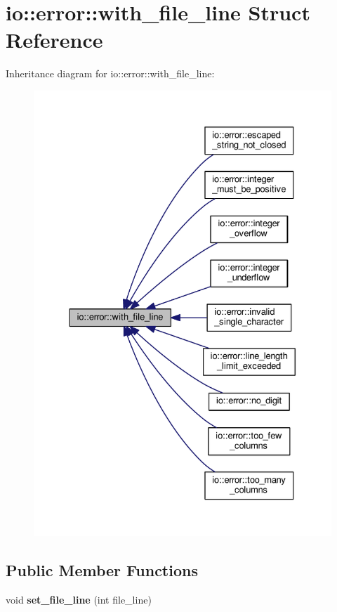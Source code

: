 \section{io\+:\+:error\+:\+:with\+\_\+file\+\_\+line Struct Reference}
\label{structio_1_1error_1_1with__file__line}


Inheritance diagram for io\+:\+:error\+:\+:with\+\_\+file\+\_\+line\+:\nopagebreak
\begin{figure}[H]
\begin{center}
\leavevmode
\includegraphics[width=330pt]{structio_1_1error_1_1with__file__line__inherit__graph}
\end{center}
\end{figure}
\subsection*{Public Member Functions}
\begin{DoxyCompactItemize}
\item 
void {\bfseries set\+\_\+file\+\_\+line} (int file\+\_\+line)\label{structio_1_1error_1_1with__file__line_aa92778a81778abc676ec6ee9952bba8c}

\end{DoxyCompactItemize}
